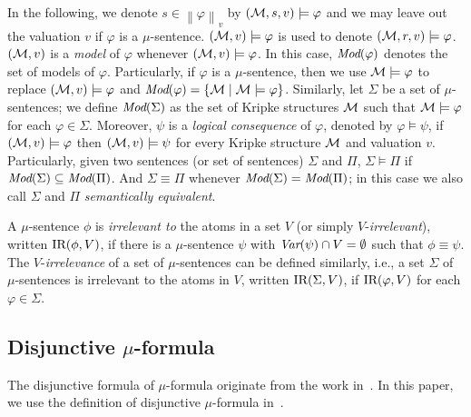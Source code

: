 \documentclass[runningheads]{llncs}
\begin{document}
In the following, we denote $s\in \left\| \varphi \right\|_v$ by $({\cal M}, s, v) \models \varphi$ and we may leave out the
valuation $v$ if $\varphi$ is a $\mu$-sentence.
$({\cal M}, v) \models \varphi$ is used to denote $({\cal M}, r, v) \models \varphi$.
$({\cal M},v)$ is a \emph{model} of $\varphi$ whenever  $({\cal M}, v) \models \varphi$.
In this case, $\textit{Mod}(\varphi)$ denotes the set of models of $\varphi$.
Particularly, if $\varphi$ is a $\mu$-sentence, then we use ${\cal M} \models \varphi$ to replace $({\cal M}, v) \models \varphi$ and $\textit{Mod}(\varphi) = \{{\cal M} \mid {\cal M} \models \varphi\}$.
Similarly, let $\Sigma$ be a set of $\mu$-sentences; we define $\textit{Mod}(\Sigma)$ as the set of Kripke structures ${\cal M}$ such that ${\cal M} \models \varphi$ for each $\varphi\in \Sigma$.
Moreover, $\psi$ is a \emph{logical consequence} of $\varphi$, denoted by $\varphi \models \psi$, if $({\cal M},v ) \models \varphi$ then $({\cal M},v) \models \psi$ for every Kripke structure ${\cal M}$ and valuation $v$.
Particularly, given two sentences (or set of sentences) $\Sigma$ and $\Pi$, $\Sigma \models \Pi$ if $\textit{Mod}(\Sigma) \subseteq \textit{Mod}(\Pi)$. And $\Sigma \equiv \Pi$ whenever $\textit{Mod}(\Sigma) = \textit{Mod}(\Pi)$; in this case we also call $\Sigma$ and $\Pi$ \emph{semantically  equivalent}.

A $\mu$-sentence $\phi$ is {\em irrelevant to} the atoms in a set $V$ (or simply $V$-{\em irrelevant}), written $\textrm{IR}(\phi,V)$,
if there is a $\mu$-sentence $\psi$ with $\textit{Var}(\psi)\cap V=\emptyset$ such that $\phi\equiv\psi$.
The $V$-{\em irrelevance} of a set of $\mu$-sentences can be defined similarly, i.e., a set $\Sigma$ of $\mu$-sentences is irrelevant to the atoms in $V$, written $\textrm{IR}(\Sigma, V)$, if $\textrm{IR}(\varphi, V)$ for each $\varphi \in \Sigma$.


\subsection{Disjunctive $\mu$-formula}
The disjunctive formula of $\mu$-formula originate from the work in~\cite{janin1995automata}.
In this paper, we use the definition of disjunctive $\mu$-formula in~\cite{d2006modal}.
\end{document}
